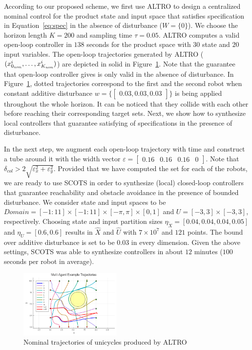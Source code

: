 According to our proposed scheme, we first use ALTRO to design a centralized nominal control for the product state and input space that satisfies specification in Equation~\eqref{eq:spec} in the absence of disturbance ($W=\{0\}$). We choose the horizon length $K=200$ and sampling time $\tau=0.05$. ALTRO computes a valid open-loop controller in $138$ seconds for the product space with $30$ state and $20$ input variables. The open-loop trajectories generated by ALTRO ($(x_{0_{\mathit{nom}}}^i,\ldots,x_{K_{\mathit{nom}}}^i)$) are depicted in solid in Figure~\ref{fig:MA}. Note that the guarantee that open-loop controller gives is only valid in the absence of disturbance. In Figure~\ref{fig:MA}, dotted trajectories correspond to the first and the second robot when constant additive disturbance $w=\{\begin{bmatrix}0.03,0.03,0.03\end{bmatrix}\}$ is being applied throughout the whole horizon. It can be noticed that they collide with each other before reaching their corresponding target sets. Next, we show how to synthesize local controllers that guarantee satisfying of specifications in the presence of disturbance. 

In the next step, we augment each open-loop trajectory with time and construct a tube around it with the width vector $\varepsilon=\begin{bmatrix}0.16&0.16&0.16&0\end{bmatrix}$. Note that $\delta_{col} > 2\sqrt{\varepsilon_x^2+\varepsilon_y^2}$. Provided that we have computed the set for each of the robots, we are ready to use SCOTS in order to synthesize (local) closed-loop controllers that guarantee reachability and obstacle avoidance in the presence of bounded disturbance. We consider state and input spaces to be $Domain=[-1:11]\times[-1:11]\times[-\pi,\pi]\times[0,1]$ and
$U=[-3,3]\times[-3,3]$, respectively. Choosing state and input partition sizes $\eta_{\widetilde{X}}=[0.04,0.04,0.04,0.05]$ and
$\eta_{U}=[0.6,0.6]$ results in $\hat X$ and $\hat U$ with $7\times 10^7$ and $121$ points. The bound over additive disturbance is set to be $0.03$ in every dimension. Given the above settings, SCOTS was able to synthesize controllers in about $12$ minutes ($100$ seconds per robot in average). 

\begin{figure}[t]\label{fig:MA}
	\centering
	\includegraphics[width=0.45\textwidth]{figures/MA.png}
	\caption{Nominal trajectories of unicycles produced by ALTRO}
\end{figure}


